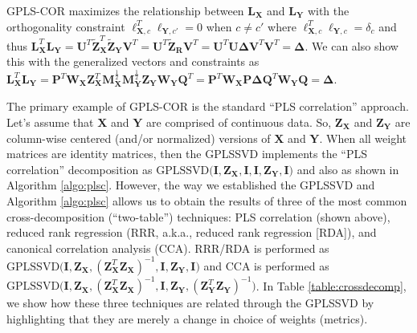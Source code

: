 \documentclass[12pt]{article}
\begin{document}
GPLS-COR maximizes the relationship between \({\mathbf L}_{\mathbf X}\)
and \({\mathbf L}_{\mathbf Y}\) with the orthogonality constraint
\({\boldsymbol \ell}_{{\mathbf X},c}^{T}{\boldsymbol \ell}_{{\mathbf Y},c'} = 0\)
when \(c \neq c'\) where
\({\boldsymbol \ell}_{{\mathbf X},c}^{T}{\boldsymbol \ell}_{{\mathbf Y},c} = \delta_{c}\)
and thus
\({\mathbf L}_{\mathbf X}^{T}{\mathbf L}_{\mathbf Y} = {\mathbf U}^{T}\widetilde{\mathbf Z}_{\mathbf X}^{T}\widetilde{\mathbf Z}_{\mathbf Y}{\mathbf V}^{T} = {\mathbf U}^{T}\widetilde{\mathbf Z}_{\mathbf R}{\mathbf V}^{T} = {\mathbf U}^{T}{\mathbf U}{\boldsymbol \Delta}{\mathbf V}^{T}{\mathbf V}^{T} = {\boldsymbol \Delta}\).
We can also show this with the generalized vectors and constraints as
\({\mathbf L}_{\mathbf X}^{T}{\mathbf L}_{\mathbf Y} = {\mathbf P}^{T}{\mathbf W}_{\mathbf X}{\mathbf Z}_{\mathbf X}^{T}{\mathbf M}_{\mathbf X}^{\frac{1}{2}}{\mathbf M}_{\mathbf Y}^{\frac{1}{2}}{\mathbf Z}_{\mathbf Y}{\mathbf W}_{\mathbf Y}{\mathbf Q}^{T} = {\mathbf P}^{T}{\mathbf W}_{\mathbf X}{\mathbf P}{\boldsymbol \Delta}{\mathbf Q}^{T}{\mathbf W}_{\mathbf Y}{\mathbf Q} = {\boldsymbol \Delta}\).

The primary example of GPLS-COR is the standard ``PLS correlation''
approach. Let's assume that \({\mathbf X}\) and \({\mathbf Y}\) are
comprised of continuous data. So, \({\mathbf Z}_{\mathbf X}\) and
\({\mathbf Z}_{\mathbf Y}\) are column-wise centered (and/or normalized)
versions of \({\mathbf X}\) and \({\mathbf Y}\). When all weight
matrices are identity matrices, then the GPLSSVD implements the ``PLS
correlation'' decomposition as
\(\mathrm{GPLSSVD(} {\mathbf I}, {\mathbf Z}_{\mathbf X}, {\mathbf I}, {\mathbf I}, {\mathbf Z}_{\mathbf Y}, {\mathbf I} \mathrm{)}\)
and also as shown in Algorithm \ref{algo:plsc}. However, the way we
established the GPLSSVD and Algorithm \ref{algo:plsc} allows us to
obtain the results of three of the most common cross-decomposition
(``two-table'') techniques: PLS correlation (shown above), reduced rank
regression (RRR, a.k.a., reduced rank regression {[}RDA{]}), and
canonical correlation analysis (CCA). RRR/RDA is performed as
\(\mathrm{GPLSSVD(} {\mathbf I}, {\mathbf Z}_{{\mathbf X}}, ({\mathbf Z}_{\mathbf X}^{T}{\mathbf Z}_{\mathbf X})^{-1}, {\mathbf I}, {\mathbf Z}_{{\mathbf Y}}, {\mathbf I}\mathrm{)}\)
and CCA is performed as
\(\mathrm{GPLSSVD(} {\mathbf I}, {\mathbf Z}_{{\mathbf X}}, ({\mathbf Z}_{\mathbf X}^{T}{\mathbf Z}_{\mathbf X})^{-1}, {\mathbf I}, {\mathbf Z}_{{\mathbf Y}}, ({\mathbf Z}_{\mathbf Y}^{T}{\mathbf Z}_{\mathbf Y})^{-1}\mathrm{)}\).
In Table \ref{table:crossdecomp}, we show how these three techniques are
related through the GPLSSVD by highlighting that they are merely a
change in choice of weights (metrics).
\end{document}
